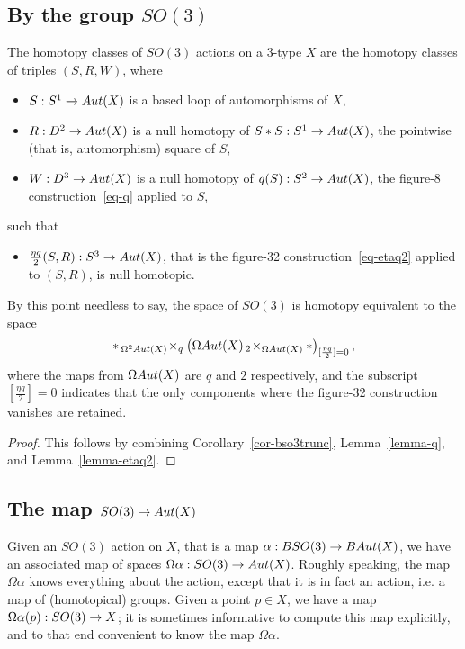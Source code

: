 \documentclass{amsart}
\begin{document}

\subsection{By the group $SO(3)$}

\begin{theorem} \label{thm-so3action}
The homotopy classes of $SO(3)$ actions on a 3-type $X$ are the homotopy classes of triples $(S,R,W)$, where 
\begin{itemize}
\item $S: S^1 \rightarrow Aut(X)$ is a based loop of automorphisms of $X$,
\item $R: D^2 \rightarrow Aut(X)$ is a null homotopy of $S \ast S: S^1 \rightarrow Aut(X)$, the pointwise (that is, automorphism) square of $S$,
\item $W: D^3 \rightarrow Aut(X)$ is a null homotopy of $q(S): S^2 \rightarrow Aut(X)$, the figure-8 construction~\eqref{eq-q} applied to $S$,
\end{itemize}
such that
\begin{itemize}
\item $\frac{\eta q}{2} (S,R) : S^3 \rightarrow Aut(X)$, that is the figure-32 construction~\eqref{eq-etaq2} applied to $(S,R)$, is null homotopic.
\end{itemize}
\end{theorem}
\nid By this point needless to say, the space of $SO(3)$ is homotopy equivalent to the space
\begin{equation} \nonumber
\ast \,_{\Omega^2 Aut(X)}\! \times_q \left(\Omega Aut(X) \,_2\! \times_{\Omega Aut(X)} \ast\right)_{[\frac{\eta q}{2}]=0},
\end{equation}
where the maps from $\Omega Aut(X)$ are $q$ and $2$ respectively, and the subscript $[\frac{\eta q}{2}]=0$ indicates that the only components where the figure-32 construction vanishes are retained.
\begin{proof}
This follows by combining Corollary~\ref{cor-bso3trunc}, Lemma~\ref{lemma-q}, and Lemma~\ref{lemma-etaq2}.
\end{proof}

\subsection{The map $SO(3) \rightarrow Aut(X)$}

Given an $SO(3)$ action on $X$, that is a map $\alpha: BSO(3) \rightarrow BAut(X)$, we have an associated map of spaces $\Omega \alpha: SO(3) \rightarrow Aut(X)$.  Roughly speaking, the map $\Omega \alpha$ knows everything about the action, except that it is in fact an action, i.e. a map of (homotopical) groups.  Given a point $p \in X$, we have a map $\Omega \alpha (p) : SO(3) \rightarrow X$; it is sometimes informative to compute this map explicitly, and to that end convenient to know the map $\Omega \alpha$.  
\end{document}
